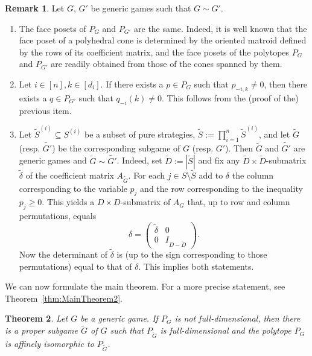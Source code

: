 \documentclass[11pt]{amsart}
\newtheorem{theorem}{Theorem}[section]
\theoremstyle{definition}
\newtheorem{remark}[theorem]{Remark}
\numberwithin{subcase}{case}
\renewcommand{\tilde}[1]{\widetilde{#1}}
\begin{document}
\begin{remark} Let $G$, $G'$ be generic games such that $G \sim G'$.
\label{RemarkGenericness}
\begin{enumerate}
    \item The face posets of $P_G$ and $P_{G'}$ are the same. Indeed, it
    is well known that the face poset of a polyhedral cone is determined
    by the oriented matroid defined by the rows of its coefficient matrix,
    and the face posets of the polytopes $P_G$ and $P_{G'}$ are readily
    obtained from those of the cones spanned by them.

    \item Let $i \in [n], k\in [d_i]$. If there exists a $p \in P_G$
    such that $p_{-i,k} \neq 0$, then there exists a $q \in P_{G'}$
    such that $q_{-i}(k) \neq 0$. This follows from the (proof of the)
    previous item. 


    \item Let $\tilde{S}^{(i)} \subseteq S^{(i)}$ be a subset of pure
    strategies, $\tilde{S}:=\prod_{i=1}^n \tilde{S}^{(i)}$, and let $\tilde{G}$ (resp. $\tilde{G'}$) be the corresponding
    subgame of $G$ (resp. $G'$). Then $\tilde{G}$ and $\tilde{G'}$
    are generic games and $\tilde{G} \sim \tilde{G'}$. Indeed, set
    $\tilde{D}:=|\tilde{S}|$ and fix any $\tilde{D}
    \times \tilde{D}$-submatrix $\tilde{\delta}$ 
    of the coefficient matrix $A_{\tilde{G}}$. For each 
    $j \in S \setminus \tilde{S}$ add to $\delta$ the column corresponding to the
    variable $p_j$ and the row corresponding to the inequality $p_j
    \geq 0$. This yields a $D \times D$-submatrix of $A_G$ that, up to row and
    column permutations, equals
    \[ \delta=\begin{pmatrix} \tilde{\delta} & 0 \\ 0 & I_{D-\tilde{D}}
    \end{pmatrix}. \]
    Now the determinant of $\tilde{\delta}$ is (up to the sign
    corresponding to those permutations) equal to that of $\delta$.
    This implies both statements. 

\end{enumerate}    
\end{remark}


\noindent We can now formulate the main theorem. For a more precise statement, see Theorem~\ref{thm:MainTheorem2}.

\begin{theorem}
\label{MainTheorem}
Let $G$ be a generic game. If $P_G$ is not full-dimensional, then there is
a proper subgame $\tilde{G}$ of $G$ such that $P_{\tilde{G}}$ is full-dimensional
and the polytope $P_G$ is affinely isomorphic to $P_{\tilde{G}}$.
\end{theorem}
\end{document}
